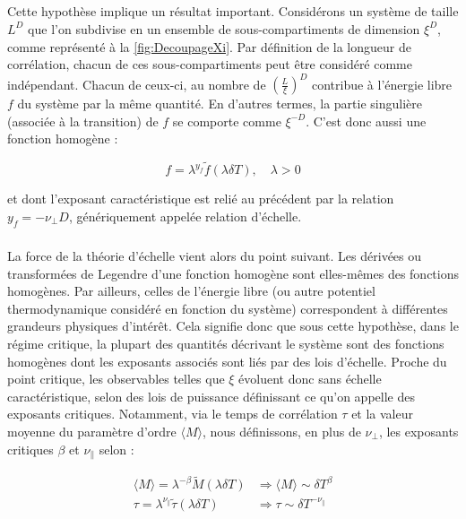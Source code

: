 \subparagraph{}Cette hypothèse implique un résultat important. Considérons un système de taille $L^D$ que l'on subdivise en un ensemble de sous-compartiments de dimension $\xi^D$, comme représenté à la \autoref{fig:DecoupageXi}. Par définition de la longueur de corrélation, chacun de ces sous-compartiments peut être considéré comme indépendant. Chacun de ceux-ci, au nombre de $\left(\frac{L}{\xi}\right)^D$ contribue à l'énergie libre $f$ du système par la même quantité. En d'autres termes, la partie singulière (associée à la transition) de $f$ se comporte comme $\xi^{-D}$. C'est donc aussi une fonction homogène :

\begin{equation}
    f = \lambda^{y_f}\tilde{f}(\lambda \delta T), \quad \lambda > 0
\end{equation}

\noindent et dont l'exposant caractéristique est relié au précédent par la relation $y_f = - \nu_\perp D$, génériquement appelée relation d'échelle. 

\subparagraph{}La force de la théorie d'échelle vient alors du point suivant. Les dérivées ou transformées de Legendre d'une fonction homogène sont elles-mêmes des fonctions homogènes. Par ailleurs, celles de l'énergie libre (ou autre potentiel thermodynamique considéré en fonction du système) correspondent à différentes grandeurs physiques d'intérêt. Cela signifie donc que sous cette hypothèse, dans le régime critique, la plupart des quantités décrivant le système sont des fonctions homogènes dont les exposants associés sont liés par des lois d'échelle. Proche du point critique, les observables telles que $\xi$ évoluent donc sans échelle caractéristique, selon des lois de puissance définissant ce qu'on appelle des exposants critiques. Notamment, via le temps de corrélation $\tau$ et la valeur moyenne du paramètre d'ordre $\langle M \rangle$, nous définissons, en plus de $\nu_\perp$, les exposants critiques $\beta$ et $\nu_\parallel$ selon :

\begin{equation}
\begin{aligned}
	\langle M \rangle = \lambda^{-\beta} \tilde{M}(\lambda \delta T) &\Rightarrow \langle M \rangle  \sim \delta T^{\beta}\\
	\tau = \lambda^{\nu_\parallel} \tilde{\tau}(\lambda \delta T) &\Rightarrow \tau \sim \delta T^{-\nu_\parallel}
\end{aligned}
\end{equation}

